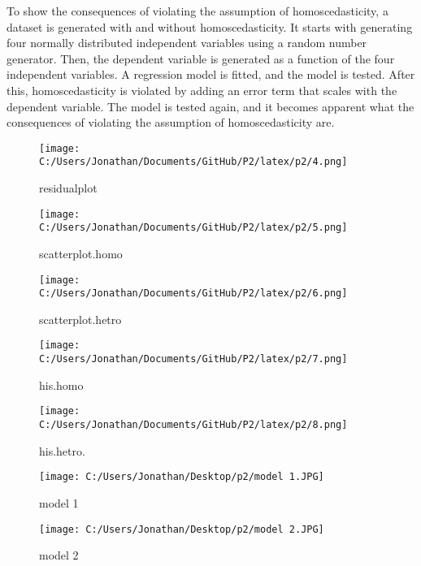 To show the consequences of violating the assumption of homoscedasticity, a dataset is generated with and without homoscedasticity. It starts with generating four normally distributed independent variables using a random number generator. Then, the dependent variable is generated as a function of the four independent variables. A regression model is fitted, and the model is tested. After this, homoscedasticity is violated by adding an error term that scales with the dependent variable. The model is tested again, and it becomes apparent what the consequences of violating the assumption of homoscedasticity are.





\begin{figure}[h] 
	\centering\texttt{[image: C:/Users/Jonathan/Documents/GitHub/P2/latex/p2/4.png]}
	\caption{residualplot}
	\label{fig:j06}
\end{figure}

\begin{figure}[h] 
	\centering\texttt{[image: C:/Users/Jonathan/Documents/GitHub/P2/latex/p2/5.png]}
	\caption{scatterplot.homo}
	\label{fig:j06}
\end{figure}

\begin{figure}[h] 
	\centering\texttt{[image: C:/Users/Jonathan/Documents/GitHub/P2/latex/p2/6.png]}
	\caption{scatterplot.hetro}
	\label{fig:j06}
\end{figure}

\begin{figure}[h] 
	\centering\texttt{[image: C:/Users/Jonathan/Documents/GitHub/P2/latex/p2/7.png]}
	\caption{his.homo}
	\label{fig:j06}
\end{figure}

\begin{figure}[h] 
	\centering
	\texttt{[image: C:/Users/Jonathan/Documents/GitHub/P2/latex/p2/8.png]}
	\caption{his.hetro.}
	\label{fig:j06}
\end{figure}


\begin{figure}[h] 
	\centering
	\texttt{[image: C:/Users/Jonathan/Desktop/p2/model 1.JPG]}
	\caption{model 1}
	\label{fig:j06}
\end{figure}

\begin{figure}[h] 
	\centering
	\texttt{[image: C:/Users/Jonathan/Desktop/p2/model 2.JPG]}
	\caption{model 2}
	\label{fig:j06}
\end{figure}

